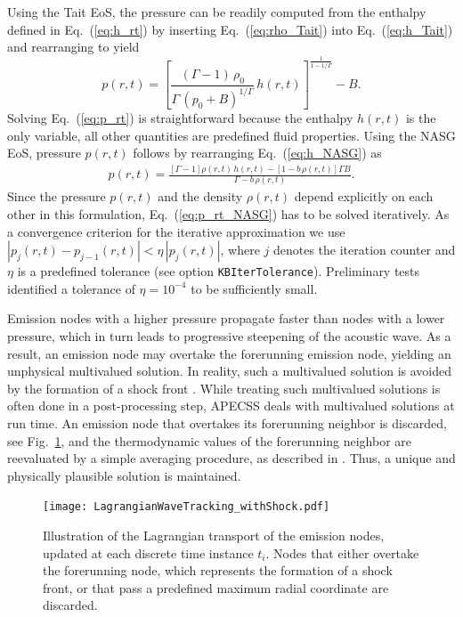 Using the Tait EoS, the pressure can be readily computed from the enthalpy defined in Eq.~(\ref{eq:h_rt}) by inserting Eq.~(\ref{eq:rho_Tait}) into Eq.~(\ref{eq:h_Tait}) and rearranging to yield
\begin{equation}
    p(r,t) = \left[ \frac{(\Gamma-1) \, \rho_0}{\Gamma \, (p_0+B)^{1/\Gamma}} \, h(r,t) \right]^{\frac{1}{1-1/\Gamma}} - B. \label{eq:p_rt}
\end{equation}
Solving Eq.~(\ref{eq:p_rt}) is straightforward because the enthalpy $h(r,t)$ is the only variable, all other quantities are predefined fluid properties. Using the NASG EoS, pressure $p(r,t)$ follows by rearranging Eq.~(\ref{eq:h_NASG}) as
\begin{eqnarray}
p(r,t) = \frac{\left[\Gamma-1\right] \rho(r,t) \, h(r,t) - \left[1 - b \, \rho(r,t) \right] \Gamma B}{\Gamma - b \, \rho(r,t)}.  \label{eq:p_rt_NASG}
\end{eqnarray}
Since the pressure $p(r,t)$ and the density $\rho(r,t)$ depend explicitly on each other in this formulation, Eq.~(\ref{eq:p_rt_NASG}) has to be solved iteratively. As a convergence criterion for the iterative approximation we use $|p_j(r,t) - p_{j-1}(r,t)| < \eta \, |p_j(r,t)|$, where $j$ denotes the iteration counter and $\eta$ is a predefined tolerance (see option {\tt KBIterTolerance}). Preliminary tests identified a tolerance of $\eta = 10^{-4}$ to be sufficiently small.

Emission nodes with a higher pressure propagate faster than nodes with a lower pressure, which in turn leads to progressive steepening of the acoustic wave. As a result, an emission node may overtake the forerunning emission node, yielding an unphysical multivalued solution. In reality, such a multivalued solution is avoided by the formation of a shock front \citep{Fay1931}. While treating such multivalued solutions is often done in a post-processing step, APECSS deals with multivalued solutions at run time. An emission node that overtakes its forerunning neighbor is discarded, see Fig.~\ref{fig:lagrangiantrackingshock}, and the thermodynamic values of the forerunning neighbor are reevaluated by a simple averaging procedure, as described in \citep{Denner2024a}. Thus, a unique and physically plausible solution is maintained.

\begin{figure}
    \begin{center}
    \texttt{[image: LagrangianWaveTracking\_withShock.pdf]}
    \caption{Illustration of the Lagrangian transport of the emission nodes, updated at each discrete time instance $t_i$. Nodes that either overtake the forerunning node, which represents the formation of a shock front, or that pass a predefined maximum radial coordinate are discarded.}
    \label{fig:lagrangiantrackingshock}
    \end{center}
\end{figure}


